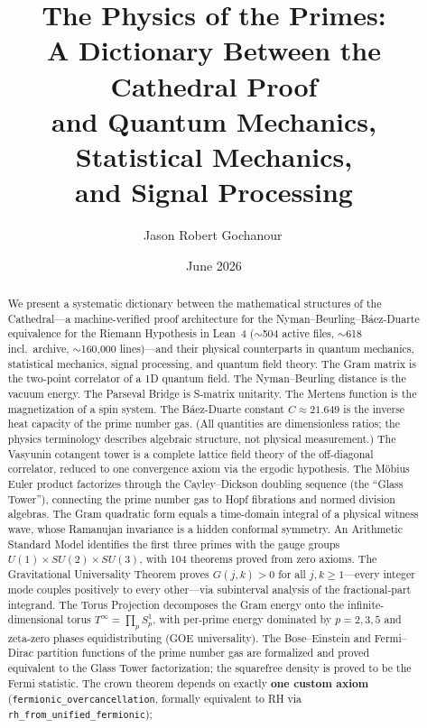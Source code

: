 \documentclass[11pt,a4paper]{article}
\title{%
  The Physics of the Primes:\\
  A Dictionary Between the Cathedral Proof\\
  and Quantum Mechanics, Statistical Mechanics,\\
  and Signal Processing%
}
\author{
  Jason Robert Gochanour\,\orcidlink{0000-0002-2862-526X}
}
\date{June 2026}
\begin{document}
\maketitle

\begin{abstract}
We present a systematic dictionary between the mathematical structures
of the Cathedral---a machine-verified proof architecture for the
Nyman--Beurling--B\'aez-Duarte equivalence for the Riemann Hypothesis
in Lean~4 ($\sim$504 active files, $\sim$618 incl.\ archive, $\sim$160{,}000 lines)---and their physical
counterparts in quantum mechanics, statistical mechanics, signal
processing, and quantum field theory.
The Gram matrix is the two-point correlator of a 1D quantum field.
The Nyman--Beurling distance is the vacuum energy.
The Parseval Bridge is S-matrix unitarity.
The Mertens function is the magnetization of a spin system.
The B\'aez-Duarte constant $C \approx 21.649$ is the inverse heat
capacity of the prime number gas.
(All quantities are dimensionless ratios; the physics terminology
describes algebraic structure, not physical measurement.)
The Vasyunin cotangent tower is a complete lattice field theory
of the off-diagonal correlator, reduced to one convergence axiom
via the ergodic hypothesis.
The M\"obius Euler product factorizes through the Cayley--Dickson
doubling sequence (the ``Glass Tower''), connecting the prime
number gas to Hopf fibrations and normed division algebras.
The Gram quadratic form equals a time-domain integral of a
physical witness wave, whose Ramanujan invariance is a hidden
conformal symmetry.
An Arithmetic Standard Model identifies the first three primes
with the gauge groups $U(1) \times SU(2) \times SU(3)$,
with 104 theorems proved from zero axioms.
The Gravitational Universality Theorem proves $G(j,k) > 0$ for
all $j,k \geq 1$---every integer mode couples positively to every
other---via subinterval analysis of the fractional-part integrand.
The Torus Projection decomposes the Gram energy onto the
infinite-dimensional torus $T^\infty = \prod_p S^1_p$,
with per-prime energy dominated by $p=2,3,5$ and
zeta-zero phases equidistributing (GOE universality).
The Bose--Einstein and Fermi--Dirac partition functions of the prime
number gas are formalized and proved equivalent to the Glass Tower
factorization; the squarefree density is proved to be the Fermi
statistic.
The crown theorem depends on exactly \textbf{one custom axiom}
(\texttt{fermionic\_overcancellation},
formally equivalent to RH via\linebreak
\texttt{rh\_from\_unified\_fermionic});

\end{abstract}
\end{document}
